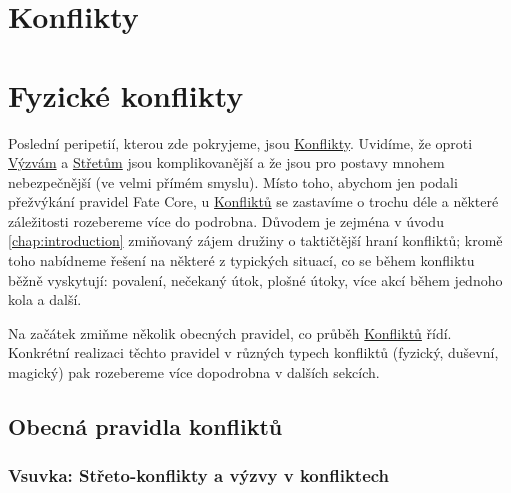 \documentclass[../main.tex]{subfiles}
\begin{document}
\section{Konflikty}

\section{Fyzické konflikty}
\label{sec:boj}

Poslední peripetií, kterou zde pokryjeme, jsou \underline{Konflikty}. Uvidíme, že oproti \underline{Výzvám} a \underline{Střetům} jsou komplikovanější a že jsou pro postavy mnohem nebezpečnější (ve velmi přímém smyslu). Místo toho, abychom jen podali přežvýkání pravidel Fate Core, u \underline{Konfliktů} se zastavíme o trochu déle a některé záležitosti rozebereme více do podrobna. Důvodem je zejména v úvodu \ref{chap:introduction} zmiňovaný zájem družiny o taktičtější hraní konfliktů; kromě toho nabídneme řešení na některé z typických situací, co se během konfliktu běžně vyskytují: povalení, nečekaný útok, plošné útoky, více akcí během jednoho kola a další.

Na začátek zmiňme několik obecných pravidel, co průběh \underline{Konfliktů} řídí. Konkrétní realizaci těchto pravidel v různých typech konfliktů (fyzický, duševní, magický) pak rozebereme více dopodrobna v dalších sekcích.

\subsection{Obecná pravidla konfliktů}
\label{sec:obecna-pravidla}

\subsubsection{Vsuvka: Střeto-konflikty a výzvy v konfliktech}
\label{sec:hybrid}
\end{document}
